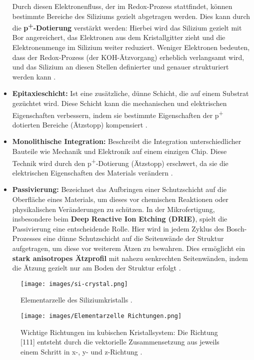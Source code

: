 \documentclass{article} %
\begin{document}
\begin{itemize}
    Durch diesen Elektronenfluss, der im Redox-Prozess stattfindet, können bestimmte Bereiche des Siliziums gezielt abgetragen werden. Dies kann durch die \textbf{p\textsuperscript{+}-Dotierung} verstärkt werden: Hierbei wird das Silizium gezielt mit Bor angereichert, das Elektronen aus dem Kristallgitter zieht und die Elektronenmenge im Silizium weiter reduziert. Weniger Elektronen bedeuten, dass der Redox-Prozess (der KOH-Ätzvorgang) erheblich verlangsamt wird, und das Silizium an diesen Stellen definierter und genauer strukturiert werden kann \cite{madou2002}.
    \item \textbf{Epitaxieschicht:} Ist eine zusätzliche, dünne Schicht, die auf einem Substrat gezüchtet wird. Diese Schicht kann die mechanischen und elektrischen Eigenschaften verbessern, indem sie bestimmte Eigenschaften der p\textsuperscript{+} dotierten Bereiche (Ätzstopp) kompensiert \cite{kittel2004}.
    \item \textbf{Monolithische Integration:} Beschreibt die Integration unterschiedlicher Bauteile wie Mechanik und Elektronik auf einem einzigen Chip. Diese Technik wird durch den p\textsuperscript{+}-Dotierung (Ätzstopp) erschwert, da sie die elektrischen Eigenschaften des Materials verändern \cite{madou2002, kittel2004}.
    \item \textbf{Passivierung:} Bezeichnet das Aufbringen einer Schutzschicht auf die Oberfläche eines Materials, um dieses vor chemischen Reaktionen oder physikalischen Veränderungen zu schützen. In der Mikrofertigung, insbesondere beim \textbf{Deep Reactive Ion Etching (DRIE)}, spielt die Passivierung eine entscheidende Rolle. Hier wird in jedem Zyklus des Bosch-Prozesses eine dünne Schutzschicht auf die Seitenwände der Struktur aufgetragen, um diese vor weiterem Ätzen zu bewahren. Dies ermöglicht ein \textbf{stark anisotropes Ätzprofil} mit nahezu senkrechten Seitenwänden, indem die Ätzung gezielt nur am Boden der Struktur erfolgt \cite{madou2002}.
\end{itemize}

\begin{figure}[htb!]
    \centering
    \texttt{[image: images/si-crystal.png]} %
    \captionsetup{labelfont=bf, width=.55\textwidth} %
    \caption{Elementarzelle des Siliziumkristalls \cite{wilderness_silicon}.}
    \label{fig:Si-Kristall}
\end{figure}

\begin{figure}[htb!]
    \centering
    \texttt{[image: images/Elementarzelle Richtungen.png]} %
    \captionsetup{labelfont=bf, width=\textwidth} %
    \caption{Wichtige Richtungen im kubischen Kristallsystem: Die Richtung [111] entsteht durch die vektorielle Zusammensetzung aus jeweils einem Schritt in x-, y- und z-Richtung \cite{grundlagen_konstruktionswerkstoffe}.}
    \label{fig:Richtungen}
\end{figure}
\end{document}
